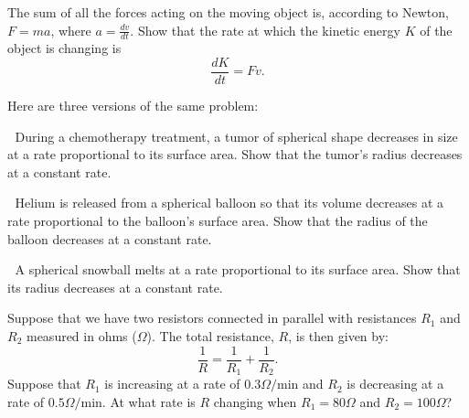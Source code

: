 \begin{multicols}{2}
\subprob The sum of all the forces acting on the moving object is, according to
Newton, $F=ma$, where $a = \frac{dv}{dt}$.  Show that the rate at which the
kinetic energy $K$ of the object is changing is
\[
  \frac{dK}{dt} = F v.
\]










\problem  Here are three versions of the same problem: 
\begin{trivlist}
\item   During a chemotherapy treatment, a tumor of spherical shape
  decreases in size at a rate proportional to its surface area. Show that
  the tumor's radius decreases at a constant rate.




\item  Helium is released from a spherical balloon so that its volume
  decreases at a rate proportional to the balloon's surface area.  Show
  that the radius of the balloon decreases at a constant rate.




\item  A spherical snowball melts at a rate proportional to its
  surface area. Show that its radius decreases at a constant rate.
\end{trivlist}




\problem Suppose that we have two resistors connected in parallel with 
resistances $R_1$ and $R_2$ measured in ohms ($\Omega$).  The total
resistance, $R$, is then given by:
\[
  \frac{1}{R}=\frac{1}{R_1}+\frac{1}{R_2}.
\]
  Suppose that $R_1$ is increasing at a rate of $0.3 \Omega/\text{min}$ and $R_2$
  is decreasing at a rate of $0.5 \Omega/\text{min}$.  At what rate is $R$
changing when $R_1=80 \Omega$ and $R_2=100 \Omega$?









\end{multicols}
